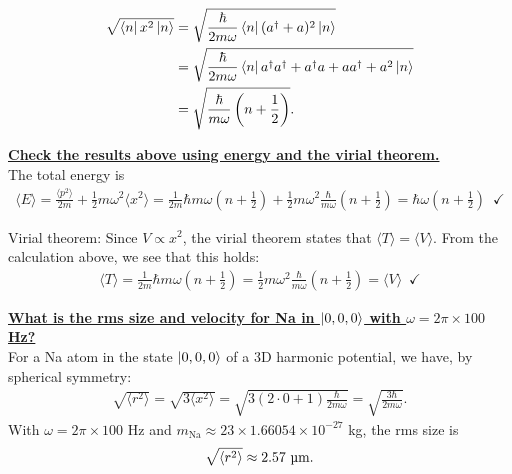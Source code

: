 \documentclass{book}
\theoremstyle{definition}
\newcommand{\f}[2]{\frac{#1}{#2}}
\newcommand{\lp}{\left(}
\newcommand{\rp}{\right)}
\begin{document}
\begin{align*}
\sqrt{\bra{n}x^2 \ket{n}} &= \sqrt{\f{\hbar}{2 m\omega}\bra{n} (a^\dagger + a)^2 \ket{n} }\\
&= \sqrt{\f{\hbar}{2 m\omega}\bra{n} a^\dagger a^\dagger +a^\dagger a + aa^\dagger + a^2 \ket{n} }\\
&= \sqrt{\f{\hbar}{m\omega}\lp n+ \f{1}{2} \rp}.
\end{align*}







\noindent \textbf{\underline{Check the results above using energy and the virial theorem.}}\\



The total energy is 
\begin{align*}
\langle  E\rangle  = \f{\langle p^2\rangle }{2m} + \f{1}{2}m\omega^2 \langle x^2\rangle = \f{1}{2m}\hbar m\omega \lp n+ \f{1}{2} \rp + \f{1}{2}m\omega^2 \f{\hbar}{m\omega}\lp n+ \f{1}{2} \rp  = \hbar \omega\lp n+ \f{1}{2}\rp \,\,\, \checkmark
\end{align*}

Virial theorem: Since $V\propto x^2$, the virial theorem states that $\langle T \rangle  = \langle V \rangle$. From the calculation above, we see that this holds:
\begin{align*}
\langle T \rangle =  \f{1}{2m}\hbar m\omega \lp n+ \f{1}{2} \rp  = \f{1}{2}m\omega^2 \f{\hbar}{m\omega}\lp n+ \f{1}{2} \rp = \langle V \rangle \,\,\, \checkmark
\end{align*}






\noindent \textbf{\underline{What is the rms size and velocity for Na in $\ket{0,0,0}$ with $\omega = 2\pi \times 100$ Hz?}}\\


For a Na atom in the state $\ket{0,0,0}$ of a 3D harmonic potential, we have, by spherical symmetry:
\begin{align*}
\sqrt{\langle r^2\rangle} = \sqrt{3\langle x^2 \rangle } = \sqrt{3(2\cdot 0+1)\f{\hbar}{2m\omega}} = \sqrt{\f{3\hbar}{2m\omega}}.
\end{align*}
With $\omega = 2\pi \times 100 $ Hz and $m_\text{Na} \approx 23 \times 1.66054\times 10^{-27}$ kg, the rms size is
\begin{align*}
\sqrt{\langle r^2\rangle} \approx 2.57 \text{ \textmu m}.
\end{align*}
\end{document}
